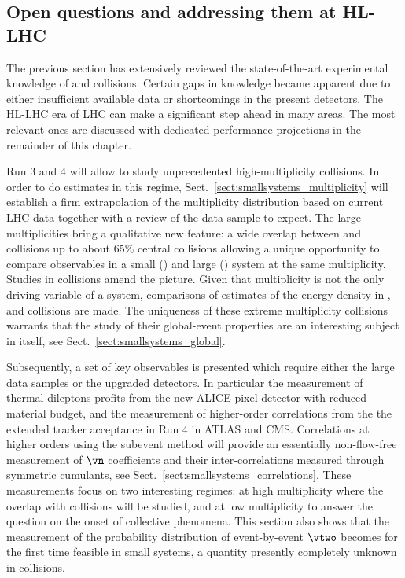 \documentclass[../report.tex]{subfiles}
\begin{document}
\subsection{Open questions and addressing them at HL-LHC}
\label{sect:smallsystems_openquestions}

The previous section has extensively reviewed the state-of-the-art experimental knowledge of \pp and \pPb collisions. Certain gaps in knowledge became apparent due to either insufficient available data or shortcomings in the present detectors. The HL-LHC era of LHC can make a significant step ahead in many areas. The most relevant ones are discussed with dedicated performance projections in the remainder of this chapter.

Run 3 and 4 will allow to study unprecedented high-multiplicity \pp collisions. In order to do estimates in this regime, Sect.~\ref{sect:smallsystems_multiplicity} will establish a firm extrapolation of the multiplicity distribution based on current LHC data together with a review of the data sample to expect. The large multiplicities bring a qualitative new feature: a wide overlap between \pp and \PbPb collisions up to about 65\% central collisions allowing a unique opportunity to compare observables in a small (\pp) and large (\PbPb) system at the same multiplicity. Studies in \pPb collisions amend the picture. Given that multiplicity is not the only driving variable of a system, comparisons of estimates of the energy density in \pp, \pPb and \PbPb collisions are made. The uniqueness of these extreme multiplicity \pp collisions warrants that the study of their global-event properties are an interesting subject in itself, see Sect.~\ref{sect:smallsystems_global}.

Subsequently, a set of key observables is presented which require either the large data samples or the upgraded detectors. In particular the measurement of thermal dileptons profits from the new ALICE pixel detector with reduced material budget, and the measurement of higher-order correlations from the the extended tracker acceptance in Run 4 in ATLAS and CMS. Correlations at higher orders using the subevent method will provide an essentially non-flow-free measurement of $\vn$ coefficients and their inter-correlations measured through symmetric cumulants, see Sect.~\ref{sect:smallsystems_correlations}. These measurements focus on two interesting regimes: at high multiplicity where the overlap with \PbPb collisions will be studied, and at low multiplicity to answer the question on the onset of collective phenomena.
This section also shows that the measurement of the probability distribution of event-by-event $\vtwo$ becomes for the first time feasible in small systems, a quantity presently completely unknown in \pp collisions.
\end{document}
